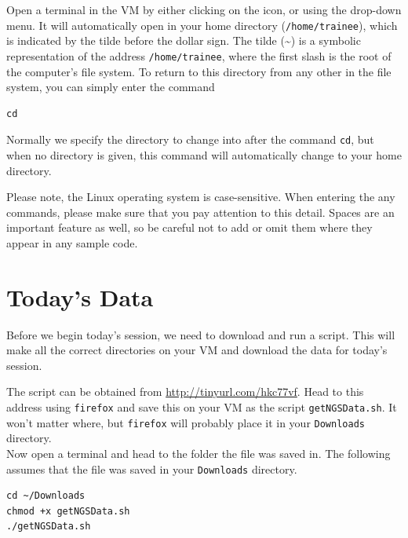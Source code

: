 \begin{steps}
Open a terminal in the VM by either clicking on the icon, or using the drop-down menu.
It will automatically open in your home directory (\texttt{/home/trainee}), which is indicated by the tilde before the dollar sign.
The tilde (\~{}) is a symbolic representation of the address \texttt{/home/trainee}, where the first slash is the root of the computer’s file system.
To return to this directory from any other in the file system, you can simply enter the command
\begin{lstlisting}
cd 
\end{lstlisting}
\end{steps}

Normally we specify the directory to change into after the command \texttt{cd}, but when no directory is given, this command will automatically change to your home directory.\\

\begin{warning}
Please note, the Linux operating system is case-sensitive.
When entering the any commands, please make sure that you pay attention to this detail.
Spaces are an important feature as well, so be careful not to add or omit them where they appear in any sample code.
\end{warning}

\section{Today's Data}

\begin{information}
Before we begin today's session, we need to download and run a script.
This will make all the correct directories on your VM and download the data for today's session.
\end{information}

\begin{steps}
The script can be obtained from \url{http://tinyurl.com/hkc77vf}.
Head to this address using \texttt{firefox} and save this on your VM as the script \texttt{getNGSData.sh}.
It won't matter where, but \texttt{firefox} will probably place it in your \texttt{Downloads} directory.\\

Now open a terminal and head to the folder the file was saved in.
The following assumes that the file was saved in your \texttt{Downloads} directory.
\begin{lstlisting}
cd ~/Downloads
chmod +x getNGSData.sh
./getNGSData.sh
\end{lstlisting}
\end{steps}

